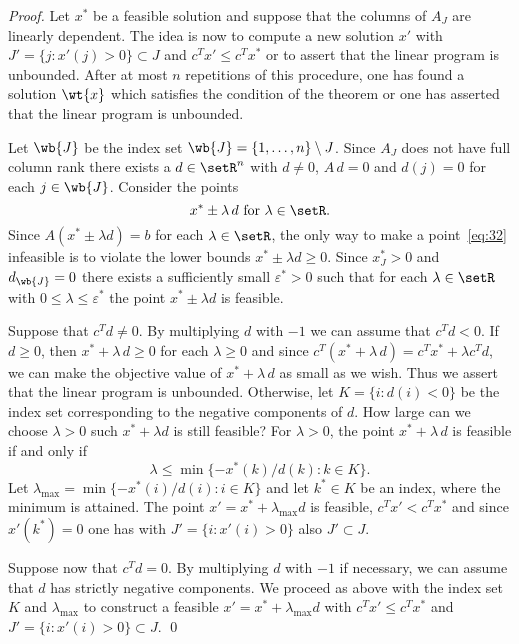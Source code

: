   \begin{proof}    
    Let $x^*$ be a feasible solution and suppose that the columns of
    $A_J$ are linearly dependent.  The idea is now to compute a new
    solution $x'$ with $J'=\{ j \colon  x'(j)>0\} \subset J$ and $c^T
    x' \leq c^T x^*$ or to assert that the linear program is
    unbounded.  After at most $n$  repetitions of this procedure,
    one has found a solution $\wt{x}$  which satisfies the condition of the
    theorem or one has asserted that the linear program is unbounded. 
             

    Let $\wb{J}$ be the index set $\wb{J}= \{1,\ldots,n\} \setminus J$.  Since
    $A_J$ does not have full column rank there exists a $d \in \setR^n$
    with $d\neq0$, $A\, d =0$ and $d(j)=0$ for each $j \in \wb{J}$.  Consider
    the points 
    \begin{equation}
      \label{eq:32}
        x^* \pm \lambda\, d  \text{ for } \lambda \in \setR.
    \end{equation}
    Since $A (x^* \pm \lambda d)
    =b$ for each $\lambda \in \setR$, the only way to make  a point~\eqref{eq:32}
    infeasible  is to violate the lower bounds $x^* \pm \lambda d \geq0$. Since
    $x^*_J>0$ and $d_{\wb{J}} =0$ there exists 
    a sufficiently small $\varepsilon^*>0$ such that for each $\lambda \in \setR$ with
    $0 \leq \lambda \leq \varepsilon^*$ the point $x^* \pm \lambda d$ is feasible. 
    
    Suppose that $c^Td \neq0$. By multiplying $d$ with $-1$
    we can assume that $c^Td <0$. If $d\geq0$, then $x^*+\lambda\,d\geq0$ for
    each $\lambda\geq0$ and since $c^T(x^*+\lambda\,d) = c^Tx^* + \lambda c^Td$, we can
    make the objective value of $x^*+\lambda\,d$ as small as we wish. Thus we
    assert that the linear program is unbounded. Otherwise, let $K =
    \{i \colon d(i) <0\}$ be the index set corresponding to the negative
    components of $d$. How large can we choose $\lambda>0$ such $x^* + \lambda
    d$ is still feasible?  For $\lambda>0$, the point  $x^* + \lambda \,d$  is
    feasible if and only if 
    \begin{equation}
      \label{eq:33}
      \lambda \leq \min\{- x^*(k) / d(k) \colon  k \in K\}. 
    \end{equation}
    Let $\lambda_{\max} = \min\{  - x^*(i) / d(i) \colon i \in K\}$ and let $k^*\in
    K$
    be an index, where the minimum is attained. The point
    $x' = x^*+ \lambda_{\max} d$ is feasible, $c^Tx' < c^Tx^*$ and
    since $x'(k^*)=0$ one has with $J' = \{ i \colon x'(i) >0\}$ also $J'\subset J$. 
    
    Suppose now that $c^Td = 0$. By multiplying $d$ with $-1$ if
    necessary, we can assume that $d$ has strictly negative
    components. We proceed as above with the index set $K$ and
    $\lambda_{\max}$ to     construct a feasible  $x' = x^*+ \lambda_{\max} d$ with
    $c^Tx' \leq c^Tx^*$ and  $J' = \{ i \colon x'(i) >0\}\subset J$.     
  \qed
\end{proof}

